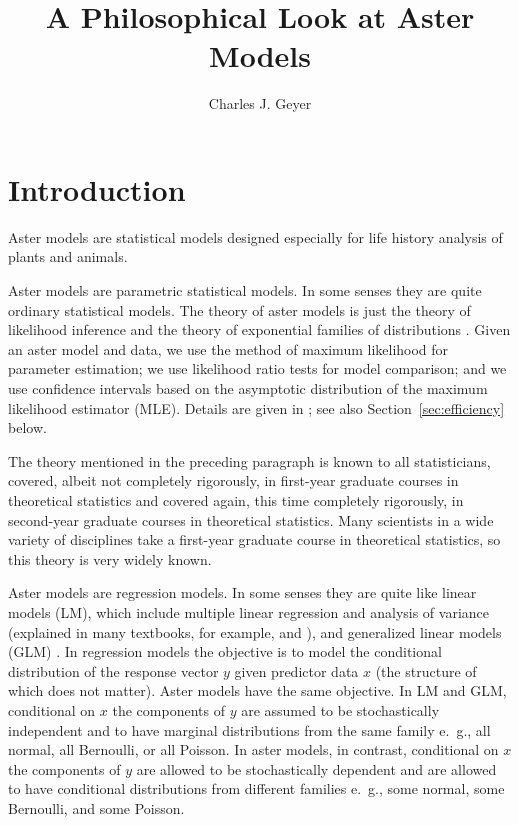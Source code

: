 \documentclass[11pt]{article}
\begin{document}
\title{A Philosophical Look at Aster Models}
\author{Charles J. Geyer}
\maketitle

\section{Introduction} \label{sec:intro}

Aster models \citep*{aster1,aster2,reaster} are statistical models designed
especially
for life history analysis of plants and animals.

Aster models are parametric statistical models.  In some senses they are
quite ordinary statistical models.  The theory of aster models is just
the theory of likelihood inference \citep{fisher1922,severini} and
the theory of exponential families of distributions
\citep{barndorff-nielsen,brown,geyer-thesis}.
Given an aster model and data, we use the method
of maximum likelihood for parameter estimation; we use likelihood ratio
tests for model comparison; and we use confidence intervals based on
the asymptotic distribution of the maximum likelihood estimator (MLE).
Details are given in \citet {aster1};
see also Section~\ref{sec:efficiency} below.

The theory mentioned in the preceding paragraph is known to all statisticians,
covered, albeit not completely rigorously, in first-year graduate courses in
theoretical statistics and covered again, this time completely rigorously,
in second-year graduate courses in theoretical statistics.  Many scientists
in a wide variety of disciplines take a first-year graduate course in
theoretical statistics, so this theory is very widely known.

Aster models are regression models.  In some senses they are
quite like linear models (LM), which include multiple linear regression
and analysis of variance (explained in many textbooks, for example,
\citealp{weisberg} and \citealp{oehlert}), and generalized
linear models (GLM) \citep{mccullagh-nelder}.  In regression models the objective
is to model the conditional distribution of the response vector $y$ given
predictor data $x$ (the structure of which does not matter).
Aster models have the same objective.  In LM and GLM, conditional on $x$
the components of $y$ are assumed to be stochastically
independent and to have marginal distributions from the same family
e.~g., all normal, all Bernoulli, or all Poisson.
In aster models, in contrast, conditional on $x$
the components of $y$ are allowed to be stochastically dependent and are
allowed to have conditional distributions from different families
e.~g., some normal, some Bernoulli, and some Poisson.
\end{document}
